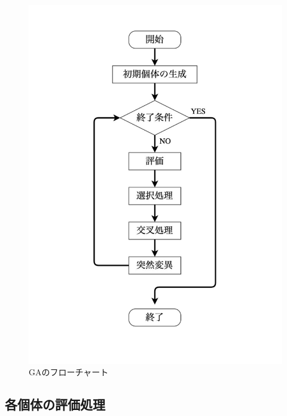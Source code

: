 \begin{figure}[p]
\begin{center}

\vspace{1.5cm}
\includegraphics[scale=0.75]{figurefolder/chapter2/GaFlowchart.pdf}
\caption{GAのフローチャート}
\label{遺伝的アルゴリズムのフローチャート}

\end{center}
\end{figure}

\clearpage


\subsection{各個体の評価処理}
\label{sec2.1.2}
  
